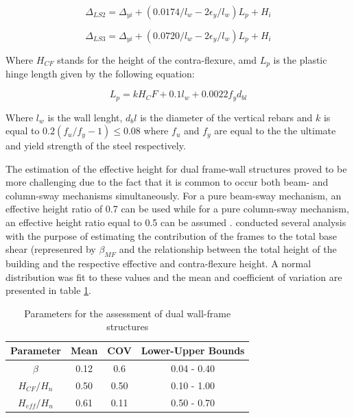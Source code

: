 \begin{equation}
\Delta_{LS2}=\Delta_{yi}+(0.0174/l_w-2\epsilon_y/l_w)L_p+H_i
\end{equation}

\begin{equation}
\Delta_{LS3}=\Delta_{yi}+(0.0720/l_w-2\epsilon_y/l_w)L_p+H_i
\end{equation}

Where $H_{CF}$ stands for the height of the contra-flexure, amd $L_p$ is the plastic hinge length given by the following equation:

\begin{equation}
L_p=kH_CF+0.1l_w+0.0022f_yd_{bl}
\end{equation}

Where $l_w$ is the wall lenght, $d_bl$ is the diameter of the vertical rebars and $k$ is equal to $0.2(f_u/f_y-1)\leq 0.08$ where $f_u$ and $f_y$ are equal to the the ultimate and yield strength of the steel respectively.

The estimation of the effective height for dual frame-wall structures proved to be more challenging due to the fact that it is common to occur both beam- and column-sway mechanisms simultaneously. For a pure beam-sway mechanism, an effective height ratio of 0.7 can be used while for a pure column-sway mechanism, an effective height ratio equal to 0.5 can be assumed \citep{Priestleyetal2007}. \citet{Baletal2010} conducted several analysis with the purpose of estimating the contribution of the frames to the total base shear (represenred by $\beta_{MF}$ and the relationship between the total height of the building and the respective effective and contra-flexure height. A normal distribution was fit to these values and the mean and coefficient of variation are presented in table \ref{table:FrameWallParameters}.

\begin{table}[ht]
\caption{Parameters for the assessment of dual wall-frame structures}
\centering
\begin{tabular}[ht]{cccc}
Parameter & Mean & COV & Lower-Upper Bounds \\[0.5ex]\hline
$\beta$ & 0.12 & 0.6 & 0.04 - 0.40   \\
$H_{CF}/H_n$ & 0.50 & 0.50 & 0.10 - 1.00   \\
$H_{eff}/H_n$ & 0.61 & 0.11& 0.50 - 0.70   \\
\end{tabular}
\label{table:FrameWallParameters}
\end{table}

